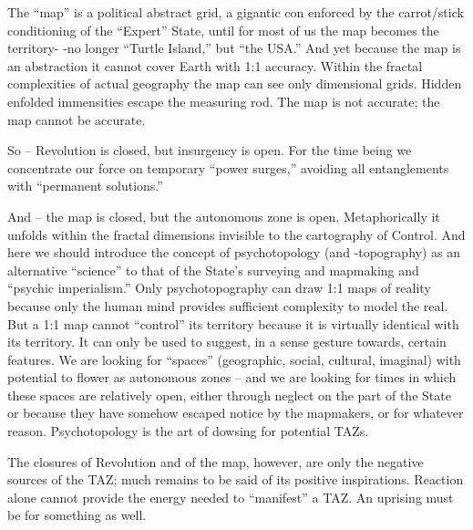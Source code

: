 \documentclass[a4paper,english,10pt,twoside]{article}
\begin{document}
\medskip
The \enquote{map} is a political abstract grid, a gigantic con enforced by the carrot/stick conditioning of the \enquote{Expert} State, until for most of us the map becomes the territory- -no longer \enquote{Turtle Island,} but \enquote{the USA.} And yet because the map is an abstraction it cannot cover Earth with 1:1 accuracy. Within the fractal complexities of actual geography the map can see only dimensional grids. Hidden enfolded immensities escape the measuring rod. The map is not accurate; the map cannot be accurate.

\medskip
So -- Revolution is closed, but insurgency is open. For the time being we concentrate our force on temporary \enquote{power surges,} avoiding all entanglements with \enquote{permanent solutions.}

\medskip
And -- the map is closed, but the autonomous zone is open. Metaphorically it unfolds within the fractal dimensions invisible to the cartography of Control. And here we should introduce the concept of psychotopology (and -topography) as an alternative \enquote{science} to that of the State's surveying and mapmaking and \enquote{psychic imperialism.} Only psychotopography can draw 1:1 maps of reality because only the human mind provides sufficient complexity to model the real. But a 1:1 map cannot \enquote{control} its territory because it is virtually identical with its territory. It can only be used to suggest, in a sense gesture towards, certain features. We are looking for \enquote{spaces} (geographic, social, cultural, imaginal) with potential to flower as autonomous zones -- and we are looking for times in which these spaces are relatively open, either through neglect on the part of the State or because they have somehow escaped notice by the mapmakers, or for whatever reason. Psychotopology is the art of dowsing for potential TAZs.

\medskip
The closures of Revolution and of the map, however, are only the negative sources of the TAZ; much remains to be said of its positive inspirations. Reaction alone cannot provide the energy needed to \enquote{manifest} a TAZ. An uprising must be for something as well.
\end{document}

